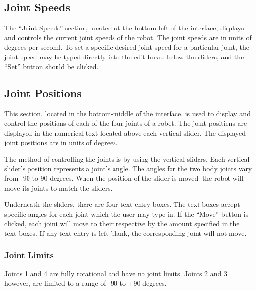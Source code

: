 \documentclass{article}
\begin{document}
\subsection{Joint Speeds}
The ``Joint Speeds'' section, located at the bottom left of the interface,
displays and controls the current joint speeds of the robot.
The joint speeds are in units of degrees per second. To set a specific 
desired joint speed for a particular joint, the joint speed may be 
typed directly into the edit boxes below the sliders, and the ``Set''
button should be clicked.
 
\subsection{Joint Positions}
This section, located in the bottom-middle of the interface, is used to display
and control the positions of each of the four
joints of a robot. The joint positions are displayed in the numerical
text located above each vertical slider. The displayed joint positions are in
units of degrees.  

The method of controlling the joints is by using the vertical sliders.
Each vertical slider's position represents a joint's angle. 
 The angles for the two body joints vary from -90 to 90 degrees. When
the position of the slider is moved, the robot will move its joints to match the 
sliders. 

Underneath the sliders, there are four text entry boxes. The text boxes
accept specific angles for each joint which the user may type in. If 
the ``Move'' button is clicked, each joint will move to their respective by the
amount specified in the text boxes. If any text entry is left blank, the
corresponding joint will not move. 

\subsubsection{Joint Limits}
Joints 1 and 4 are fully rotational and have no joint limits. Joints 2 and 3, however, are 
limited to a range of -90 to +90 degrees.
\end{document}
